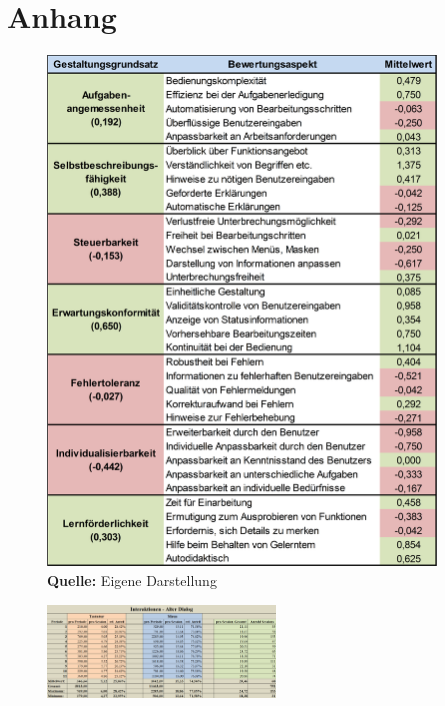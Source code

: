 \section*{Anhang}

\anhangsverzeichnis

\label{sec:auswertungsmatrixAlterDialog}
\begin{minipage}{\textwidth}
    \begin{figure}[H]
      \centering
      \includegraphics[width=390px]{img/Auswertungsmatrix_Alter_Dialog.PNG}
      \caption*{\textbf{Quelle:} Eigene Darstellung}
      \label{fig:auswertungsmatrixAlterDialog}
    \end{figure}
\end{minipage}

\label{sec:datentabelleAlterDialog}
\begin{figure}[H]
    \begin{minipage}[H]{1\textwidth}	
        \centering
         \includegraphics[angle=90, width=0.54\textwidth]{img/Datentabelle_Alter_Dialog}
        \label{fig:datentabelleAlterDialog}
    \end{minipage}
\end{figure}

